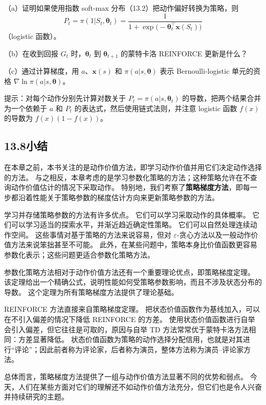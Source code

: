 \documentclass[UTF8,12pt,a4paper,fontset=fandol]{ctexart}
\begin{document}
（a）证明如果使用指数 soft-max 分布（13.2）把动作偏好转换为策略，则
\[
P_t=\pi(1|S_t,\boldsymbol{\theta}_t)=\frac{1}{1+\exp\bigl(-\boldsymbol{\theta}_t^\top\mathbf{x}(S_t)\bigr)}
\]
（logistic 函数）。

（b）在收到回报 $G_t$ 时，$\boldsymbol{\theta}_t$ 到 $\boldsymbol{\theta}_{t+1}$ 的蒙特卡洛 REINFORCE 更新是什么？

（c）通过计算梯度，用 $a$、$\mathbf{x}(s)$ 和 $\pi(a|s,\boldsymbol{\theta})$ 表示 Bernoulli-logistic 单元的资格 $\nabla\ln\pi(a|s,\boldsymbol{\theta})$。

提示：对每个动作分别先计算对数关于 $P_t=\pi(a|s,\boldsymbol{\theta}_t)$ 的导数，把两个结果合并为一个依赖于 $a$ 和 $P_t$ 的表达式，然后使用链式法则，并注意 logistic 函数 $f(x)$ 的导数为 $f(x)(1-f(x))$。

\subsection*{13.8\quad 小结}

在本章之前，本书关注的是动作价值方法，即学习动作价值并用它们决定动作选择的方法。
与之相反，本章考虑的是学习参数化策略的方法；这种策略允许在不查询动作价值估计的情况下采取动作。
特别地，我们考察了\textbf{策略梯度方法}，即每一步都沿着性能关于策略参数的梯度估计方向来更新策略参数的方法。

学习并存储策略参数的方法有许多优点。
它们可以学习采取动作的具体概率。
它们可以学习适当的探索水平，并渐近趋近确定性策略。
它们可以自然处理连续动作空间。
这些事情对基于策略的方法来说容易，但对 $\varepsilon$-贪心方法以及一般动作价值方法来说笨拙甚至不可能。
此外，在某些问题中，策略本身比价值函数更容易参数化表示；这些问题更适合参数化策略方法。

参数化策略方法相对于动作价值方法还有一个重要理论优点，即策略梯度定理。
该定理给出一个精确公式，说明性能如何受策略参数影响，而且不涉及状态分布的导数。
这个定理为所有策略梯度方法提供了理论基础。

REINFORCE 方法直接来自策略梯度定理。
把状态价值函数作为基线加入，可以在不引入偏差的情况下降低 REINFORCE 的方差。
使用状态价值函数进行自举会引入偏差，但它往往是可取的，原因与自举 TD 方法常常优于蒙特卡洛方法相同：方差显著降低。
状态价值函数为策略的动作选择分配信用，也就是对其进行“评论”；因此前者称为评论家，后者称为演员，整体方法称为演员--评论家方法。

总体而言，策略梯度方法提供了一组与动作价值方法显著不同的优势和弱点。
今天，人们在某些方面对它们的理解还不如动作价值方法充分，但它们也是令人兴奋并持续研究的主题。
\end{document}
